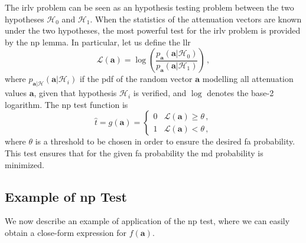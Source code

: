 \documentclass[conference,final]{IEEEtran}
\begin{document}
The \ac{irlv} problem can be seen as an hypothesis testing problem between the two hypotheses $\mathcal H_0$ and $\mathcal H_1$. When the statistics of the attenuation vectors are known under the two hypotheses, the most powerful test for the \ac{irlv} problem is provided by the \ac{np} lemma. In particular, let us  define the \ac{llr}
\begin{equation}\label{eq:lr}
    \mathcal{L}{(\bm a)}=\log\left(\frac{p_{\bm a}(\bm a|\mathcal{H}_0)}{p_{\bm a}(\bm a|\mathcal{H}_1)}\right)\,,
\end{equation}
where $p_{\bm a|\mathcal{H}}(\bm a|\mathcal{H}_i)$ if the \ac{pdf} of the random vector $\bm a$ modelling all attenuation values $\bm a$, given that hypothesis $\mathcal H_i$ is verified, and $\log$ denotes the base-2 logarithm. The \ac{np} test function is 
\begin{equation}
\label{eq:thrOpt}
    \hat{t} = g(\bm a) = \begin{cases}
    0 & \mathcal{L}{(\bm a)} \geq \theta\,, \\ 
    1 & \mathcal{L}{(\bm a)} < \theta\,, 
    \end{cases}
\end{equation}
where $\theta$ is a threshold to be chosen in order to ensure the desired \ac{fa} probability. This test ensures that for the given \ac{fa} probability the \ac{md} probability is minimized. 

\subsection{Example of \ac{np} Test}
\label{sec:los}
We now describe an example of application of the \ac{np} test, where we can easily obtain a close-form expression for $f(\bm a)$. 
\end{document}
